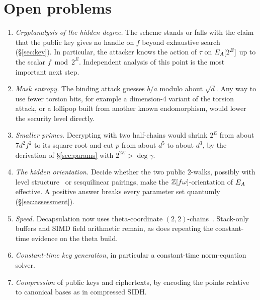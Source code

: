 \section{Open problems}\label{sec:conclusion}

\begin{enumerate}
\item \emph{Cryptanalysis of the hidden degree.} The scheme stands or falls
  with the claim that the public key gives no handle on $f$ beyond
  exhaustive search (\S\ref{sec:key}). In particular, the attacker knows the
  action of $\tau$ on $E_A[2^E]$ up to the scalar $f\bmod 2^E$. Independent
  analysis of this point is the most important next step.
\item \emph{Mask entropy.} The binding attack guesses $b/a$ modulo about
  $\sqrt d$. Any way to use fewer torsion bits, for example a dimension-4
  variant of the torsion attack, or a lollipop built from another known
  endomorphism, would lower the security level directly.
\item \emph{Smaller primes.} Decrypting with two half-chains would shrink
  $2^E$ from about $7d^2f^2$ to its square root and cut $p$ from about $d^5$ to
  about $d^3$, by the derivation of \S\ref{sec:params} with $2^{2E}>\deg\gamma$.
\item \emph{The hidden orientation.} Decide whether the two public
  $2$-walks, possibly with level structure~\cite{DFP24,Arpin24} or
  sesquilinear pairings, make the $\mathbb{Z}[f\omega]$-orientation of $E_A$
  effective. A positive answer breaks every parameter set quantumly
  (\S\ref{sec:assessment}).
\item \emph{Speed.} Decapsulation now uses theta-coordinate
  $(2,2)$-chains~\cite{DMPR23}. Stack-only buffers and SIMD field arithmetic
  remain, as does repeating the constant-time evidence on the theta build.
\item \emph{Constant-time key generation}, in particular a constant-time
  norm-equation solver.
\item \emph{Compression} of public keys and ciphertexts, by encoding the
  points relative to canonical bases as in compressed SIDH.
\end{enumerate}

